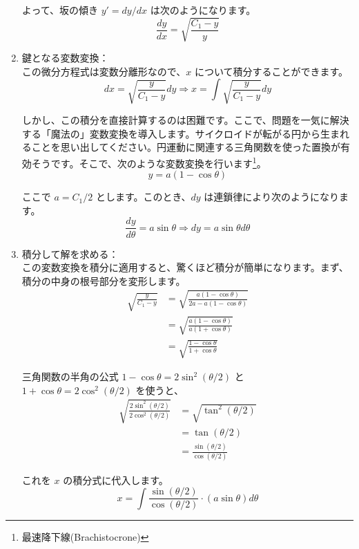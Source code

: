 \documentclass[a4paper,12pt]{bxjsarticle}
\begin{document}
\begin{enumerate}
よって、坂の傾き $y'=dy/dx$ は次のようになります。
\begin{equation}
\frac{dy}{dx}=\sqrt{\frac{C_1-y}{y}}
\end{equation}

\item 鍵となる変数変換：\\
この微分方程式は変数分離形なので、$x$ について積分することができます。
\begin{equation}
dx=\sqrt{\frac{y}{C_1-y}}dy \Rightarrow x=\int\sqrt{\frac{y}{C_1-y}}dy
\end{equation}

しかし、この積分を直接計算するのは困難です。ここで、問題を一気に解決する「魔法の」変数変換を導入します。サイクロイドが転がる円から生まれることを思い出してください。円運動に関連する三角関数を使った置換が有効そうです。そこで、次のような変数変換を行います\footnote{最速降下線(Brachistocrone)}。
\begin{equation}
y=a(1-\cos\theta)
\end{equation}

ここで $a=C_1/2$ とします。このとき、$dy$ は連鎖律により次のようになります。
\begin{equation}
\frac{dy}{d\theta}=a\sin\theta \Rightarrow dy=a\sin\theta d\theta
\end{equation}

\item 積分して解を求める：\\
この変数変換を積分に適用すると、驚くほど積分が簡単になります。まず、積分の中身の根号部分を変形します。
\begin{align}
\sqrt{\frac{y}{C_1 - y}} &= \sqrt{\frac{a(1-\cos\theta)}{2a - a(1-\cos\theta)}} \\
&= \sqrt{\frac{a(1-\cos\theta)}{a(1+\cos\theta)}} \\
&= \sqrt{\frac{1-\cos\theta}{1+\cos\theta}}
\end{align}

三角関数の半角の公式 $1-\cos\theta=2\sin^2(\theta/2)$ と $1+\cos\theta=2\cos^2(\theta/2)$ を使うと、
\begin{align}
\sqrt{\frac{2\sin^2(\theta/2)}{2\cos^2(\theta/2)}} &= \sqrt{\tan^2(\theta/2)} \\
&= \tan(\theta/2) \\
&= \frac{\sin(\theta/2)}{\cos(\theta/2)}
\end{align}

これを $x$ の積分式に代入します。
\begin{equation}
x=\int\frac{\sin(\theta/2)}{\cos(\theta/2)} \cdot (a\sin\theta)d\theta
\end{equation}


\end{enumerate}
\end{document}
